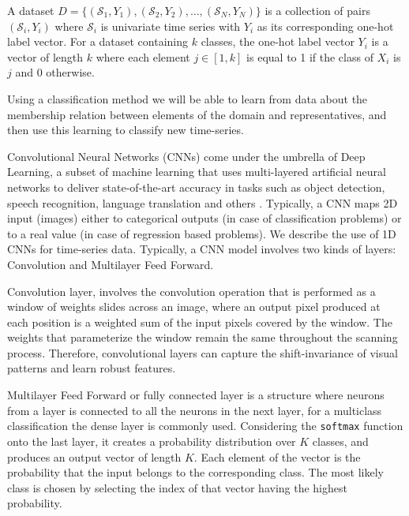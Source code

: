 \begin{definition}
A dataset $D=\{(\mathcal{S}_1,Y_1),(\mathcal{S}_2,Y_2), \ldots ,(\mathcal{S}_N,Y_N)\}$ is a collection of pairs $(\mathcal{S}_i,Y_i)$ where $\mathcal{S}_i$ is univariate time series with $Y_i$ as its corresponding one-hot label vector.  For a dataset containing $k$ classes, the one-hot label vector $Y_i$ is a vector of length $k$ where each element $j \in [1,k]$ is equal to 1 if the class of $X_i$ is $j$ and $0$ otherwise.
\end{definition}

Using a classification method we will be able to learn from data about the membership relation between elements of the domain and representatives, and then use this learning to classify new time-series. 



Convolutional Neural Networks (CNNs) come under the umbrella of Deep Learning, a subset of machine learning that uses multi-layered artificial neural networks to deliver state-of-the-art accuracy in tasks such as object detection, speech recognition, language translation and others \cite{}. Typically, a CNN maps 2D input (images) either to categorical outputs (in case of classification problems) or to a real value (in case of regression based problems). We describe the use of 1D CNNs for time-series data. Typically, a CNN model involves two kinds of layers: Convolution and Multilayer Feed Forward. 

Convolution layer, involves the convolution operation that is performed as a window of weights slides across an image, where an output pixel produced at each position is a weighted sum of the input pixels covered by the window. The weights that parameterize the window remain the same throughout the scanning process. Therefore, convolutional layers can capture the shift-invariance of visual patterns and learn robust features.

Multilayer Feed Forward or fully connected layer is a structure where neurons from a layer is connected to all the neurons in the next layer, for a multiclass classification the dense layer is commonly used. Considering the \texttt{softmax} function onto the last layer, it creates a probability distribution over $K$ classes, and produces an output vector of length $K$. Each element of the vector is the probability that the input belongs to the corresponding class. The most likely class is chosen by selecting the index of that vector having the highest probability.

